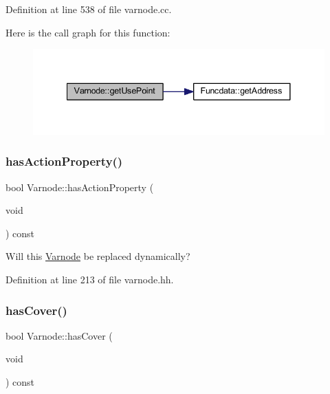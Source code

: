 Definition at line 538 of file varnode.\+cc.

Here is the call graph for this function\+:
\nopagebreak
\begin{figure}[H]
\begin{center}
\leavevmode
\includegraphics[width=341pt]{class_varnode_a9eab83050278fb3bd44d6179154e38de_cgraph}
\end{center}
\end{figure}
\mbox{\label{class_varnode_aa3b790c304c4a2868001d2ea794e7582}} 
\subsubsection{\texorpdfstring{hasActionProperty()}{hasActionProperty()}}
{\footnotesize\ttfamily bool Varnode\+::has\+Action\+Property (\begin{DoxyParamCaption}\item[{void}]{ }\end{DoxyParamCaption}) const\hspace{0.3cm}{\ttfamily [inline]}}



Will this \mbox{\hyperlink{class_varnode}{Varnode}} be replaced dynamically? 



Definition at line 213 of file varnode.\+hh.

\mbox{\label{class_varnode_a907053b388958d0f381226828ac4d47e}} 
\subsubsection{\texorpdfstring{hasCover()}{hasCover()}}
{\footnotesize\ttfamily bool Varnode\+::has\+Cover (\begin{DoxyParamCaption}\item[{void}]{ }\end{DoxyParamCaption}) const\hspace{0.3cm}{\ttfamily [inline]}}



